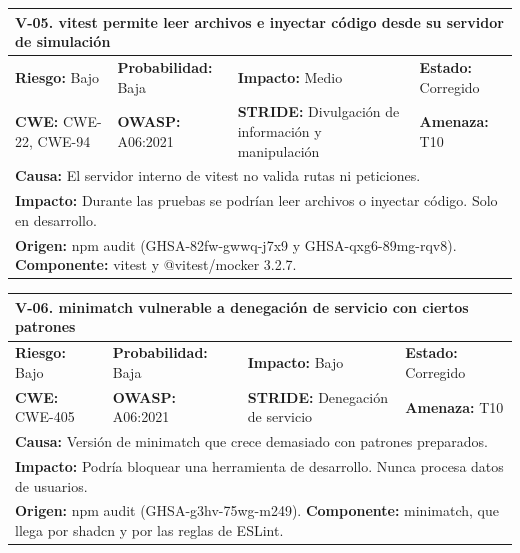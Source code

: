 \documentclass[12pt, letterpaper]{article}
\begin{document}
\vspace{8pt}

\noindent\begin{tabular}{|p{\celda}|p{\celda}|p{\celda}|p{\celda}|}
\hline
\multicolumn{4}{|p{\fila}|}{\cellcolor{gray!12}\textbf{V-05. vitest permite leer archivos e inyectar código desde su servidor de simulación}} \\
\hline
\cellcolor{yellow!25}\textbf{Riesgo:} Bajo & \textbf{Probabilidad:} Baja & \textbf{Impacto:} Medio & \textbf{Estado:} Corregido \\
\hline
\textbf{CWE:} CWE-22, CWE-94 & \textbf{OWASP:} A06:2021 & \textbf{STRIDE:} Divulgación de información y manipulación & \textbf{Amenaza:} T10 \\
\hline
\multicolumn{4}{|p{\fila}|}{\textbf{Causa:} El servidor interno de vitest no valida rutas ni peticiones.} \\
\hline
\multicolumn{4}{|p{\fila}|}{\textbf{Impacto:} Durante las pruebas se podrían leer archivos o inyectar código. Solo en desarrollo.} \\
\hline
\multicolumn{4}{|p{\fila}|}{\textbf{Origen:} npm audit (GHSA-82fw-gwwq-j7x9 y GHSA-qxg6-89mg-rqv8). \textbf{Componente:} vitest y @vitest/mocker 3.2.7.} \\
\hline
\end{tabular}

\vspace{8pt}

\noindent\begin{tabular}{|p{\celda}|p{\celda}|p{\celda}|p{\celda}|}
\hline
\multicolumn{4}{|p{\fila}|}{\cellcolor{gray!12}\textbf{V-06. minimatch vulnerable a denegación de servicio con ciertos patrones}} \\
\hline
\cellcolor{yellow!25}\textbf{Riesgo:} Bajo & \textbf{Probabilidad:} Baja & \textbf{Impacto:} Bajo & \textbf{Estado:} Corregido \\
\hline
\textbf{CWE:} CWE-405 & \textbf{OWASP:} A06:2021 & \textbf{STRIDE:} Denegación de servicio & \textbf{Amenaza:} T10 \\
\hline
\multicolumn{4}{|p{\fila}|}{\textbf{Causa:} Versión de minimatch que crece demasiado con patrones preparados.} \\
\hline
\multicolumn{4}{|p{\fila}|}{\textbf{Impacto:} Podría bloquear una herramienta de desarrollo. Nunca procesa datos de usuarios.} \\
\hline
\multicolumn{4}{|p{\fila}|}{\textbf{Origen:} npm audit (GHSA-g3hv-75wg-m249). \textbf{Componente:} minimatch, que llega por shadcn y por las reglas de ESLint.} \\
\hline
\end{tabular}
\end{document}
